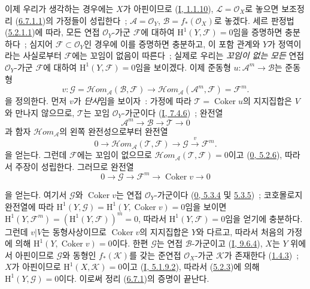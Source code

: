 이제 우리가 생각하는 경우에는 $X$가 아핀이므로
(\hyperref[I.1.1.10-ko]{I, 1.1.10}), $\mathcal{L}=\mathcal{O}_X$로 놓으면
보조정리 (\hyperref[II.6.7.1.1-ko]{6.7.1.1})의 가정들이 성립한다~;
$\mathcal{A}=\mathcal{O}_Y$, $\mathcal{B}=f_*(\mathcal{O}_X)$로 놓겠다.
세르 판정법 (\hyperref[II.5.2.1.1-ko]{5.2.1.1})에 따라, 모든 연접
$\mathcal{O}_Y$-가군 $\mathcal{F}$에 대하여
$\mathrm{H}^1(Y,\mathcal{F})=0$임을 증명하면 충분하다~; 심지어
$\mathcal{F}\subset\mathcal{O}_Y$인 경우에 이를 증명하면 충분하고,
이 포함 관계와 $Y$가 정역이라는 사실로부터 $\mathcal{F}$에는 꼬임이
없음이 따른다~; 실제로 우리는 \emph{꼬임이 없는} \emph{모든} 연접
$\mathcal{O}_Y$-가군 $\mathcal{F}$에 대하여
$\mathrm{H}^1(Y,\mathcal{F})=0$임을 보이겠다. 이제 준동형
$u:\mathcal{A}^m\to\mathcal{B}$는 준동형
\[
v:\mathcal{G}
=\mathcal{H}om_{\mathcal{A}}(\mathcal{B},\mathcal{F})
\longrightarrow
\mathcal{H}om_{\mathcal{A}}(\mathcal{A}^m,\mathcal{F})
=\mathcal{F}^m.
\]
을 정의한다. 먼저 $v$가 \emph{단사}임을 보이자~: 가정에 따라
$\mathcal{T}=\operatorname{Coker}u$의 지지집합은 $V$와 만나지 않으므로,
$\mathcal{T}$는 꼬임 $\mathcal{O}_Y$-가군이다
(\hyperref[I.7.4.6-ko]{I, 7.4.6})~; 완전열
\[
\mathcal{A}^m\longrightarrow\mathcal{B}\longrightarrow\mathcal{T}
\longrightarrow0
\]
과 함자 $\mathcal{H}om_{\mathcal{A}}$의 왼쪽 완전성으로부터 완전열
\[
0\longrightarrow
\mathcal{H}om_{\mathcal{A}}(\mathcal{T},\mathcal{F})
\longrightarrow\mathcal{G}\xrightarrow{v}\mathcal{F}^m.
\]
을 얻는다. 그런데 $\mathcal{F}$에는 꼬임이 없으므로
$\mathcal{H}om_{\mathcal{A}}(\mathcal{T},\mathcal{F})=0$이고
(\hyperref[0.5.2.6-ko]{0, 5.2.6}), 따라서 주장이 성립한다. 그러므로
완전열
\[
0\longrightarrow\mathcal{G}\longrightarrow\mathcal{F}^m
\longrightarrow\operatorname{Coker}v\longrightarrow0
\]


을 얻는다. 여기서 $\mathcal{G}$와 $\operatorname{Coker}v$는 연접
$\mathcal{O}_Y$-가군이다
(\hyperref[0.5.3.4-ko]{0, 5.3.4} 및
\hyperref[0.5.3.5-ko]{5.3.5})~; 코호몰로지 완전열에 따라
$\mathrm{H}^1(Y,\mathcal{G})
=\mathrm{H}^1(Y,\operatorname{Coker}v)=0$임을 보이면
$\mathrm{H}^1(Y,\mathcal{F}^m)
=(\mathrm{H}^1(Y,\mathcal{F}))^m=0$, 따라서
$\mathrm{H}^1(Y,\mathcal{F})=0$임을 얻기에 충분하다. 그런데 $v|V$는
동형사상이므로 $\operatorname{Coker}v$의 지지집합은 $Y$와 다르고,
따라서 처음의 가정에 의해
$\mathrm{H}^1(Y,\operatorname{Coker}v)=0$이다. 한편 $\mathcal{G}$는 연접
$\mathcal{B}$-가군이고 (\hyperref[I.9.6.4-ko]{I, 9.6.4}), $X$는 $Y$
위에서 아핀이므로 $\mathcal{G}$와 동형인 $f_*(\mathcal{K})$를 갖는
준연접 $\mathcal{O}_X$-가군 $\mathcal{K}$가 존재한다
(\hyperref[II.1.4.3-ko]{1.4.3})~; $X$가 아핀이므로
$\mathrm{H}^1(X,\mathcal{K})=0$이고
(\hyperref[I.5.1.9.2-ko]{I, 5.1.9.2}), 따라서
(\hyperref[II.5.2.3-ko]{5.2.3})에 의해
$\mathrm{H}^1(Y,\mathcal{G})=0$이다. 이로써 정리
(\hyperref[II.6.7.1-ko]{6.7.1})의 증명이 끝난다.

